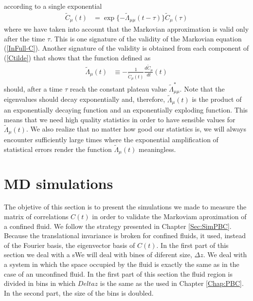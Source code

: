 \documentclass[b5paper,openright,11pt]{book}
\begin{document}
according to a single exponential
\begin{align}
  \tilde{C}_\mu(t)&=\exp\{-\tilde{\Lambda}_{\mu\mu} (t-\tau)\}  \tilde{C}_\mu(\tau)
\end{align}
where we have  taken into account that the  Markovian approximation is
valid only after the time $\tau$. This is one signature of the validity of the
Markovian equation (\ref{InFull-C}). Another signature of the validity is obtained from
each component of (\ref{Ctilde}) that shows that the function defined
as
\begin{align}
  \tilde{\Lambda}_{\mu}(t)&\equiv -\frac{1}{{\tilde{C}}_{\mu}(t)}\frac{d{\tilde{C}}_{\mu}}{dt}(t)
\label{LambdatRec}
\end{align}
should,  after  a time  $\tau$  reach  the  constant plateau  value  $
\tilde{\Lambda}_{\mu\mu}^*$.  Note  that the eigenvalues  should decay
exponentially  and,  therefore,  $  \tilde{\Lambda}_{\mu}(t)$  is  the
product  of an  exponentially decaying  function and  an exponentially
exploding function. This means that we need high quality statistics in
order  to have  sensible values  for $  \tilde{\Lambda}_{\mu}(t)$.  We
also realize that no matter how good our statistics is, we will always
encounter sufficiently large times where the exponential amplification
of statistical errors render  the function $ \tilde{\Lambda}_{\mu}(t)$
meaningless.

\section{MD simulations}
\label{Sec:SimWALLS}
The objetive of this section is to present the simulations we made to measure the matrix of correlations $C(t)$ in order to validate the Markoviam aproximation of a confined fluid. 
We follow the strategy presented in Chapter \ref{Sec:SimPBC}. Because the translational invariance is broken for confined fluids, it used, instead of the Fourier basis, the eigenvector basis of $C(t)$. 
In the first part of this section we deal with a sWe will deal with bines of diferent size, $\Delta z$.  
We deal with a system in which the space occupied by the fluid is exactly the same as in the case of an unconfined fluid. In the first part of this section the fluid region is divided in bins in which $Delta z$ is the same as the used in Chapter \ref{Chap:PBC}. In the second part, the size of the bins is doubled. 
\end{document}
